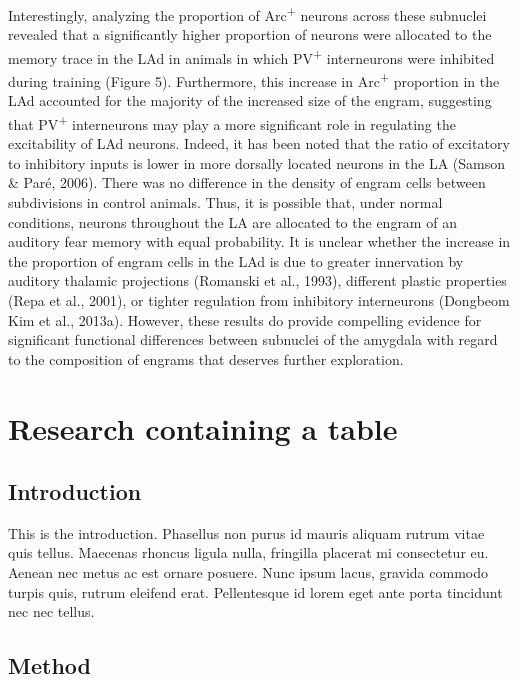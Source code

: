 \documentclass[12pt,a4paper,]{report}
\begin{document}
Interestingly, analyzing the proportion of Arc\textsuperscript{+}
neurons across these subnuclei revealed that a significantly higher
proportion of neurons were allocated to the memory trace in the LAd in
animals in which PV\textsuperscript{+} interneurons were inhibited
during training (Figure 5). Furthermore, this increase in
Arc\textsuperscript{+} proportion in the LAd accounted for the majority
of the increased size of the engram, suggesting that
PV\textsuperscript{+} interneurons may play a more significant role in
regulating the excitability of LAd neurons. Indeed, it has been noted
that the ratio of excitatory to inhibitory inputs is lower in more
dorsally located neurons in the LA (Samson \& Paré, 2006). There was no
difference in the density of engram cells between subdivisions in
control animals. Thus, it is possible that, under normal conditions,
neurons throughout the LA are allocated to the engram of an auditory
fear memory with equal probability. It is unclear whether the increase
in the proportion of engram cells in the LAd is due to greater
innervation by auditory thalamic projections (Romanski et al., 1993),
different plastic properties (Repa et al., 2001), or tighter regulation
from inhibitory interneurons (Dongbeom Kim et al., 2013a). However,
these results do provide compelling evidence for significant functional
differences between subnuclei of the amygdala with regard to the
composition of engrams that deserves further exploration.

\chapter{Research containing a table}\label{research-containing-a-table}

\section{Introduction}\label{introduction-4}

This is the introduction. Phasellus non purus id mauris aliquam rutrum
vitae quis tellus. Maecenas rhoncus ligula nulla, fringilla placerat mi
consectetur eu. Aenean nec metus ac est ornare posuere. Nunc ipsum
lacus, gravida commodo turpis quis, rutrum eleifend erat. Pellentesque
id lorem eget ante porta tincidunt nec nec tellus.

\section{Method}\label{method-2}
\end{document}
